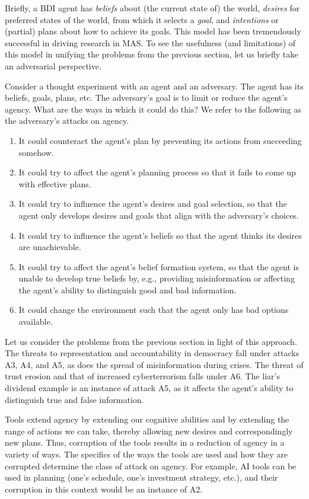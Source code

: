 Briefly, a BDI agent has \emph{beliefs} about (the current state of) the world, \emph{desires} for preferred states of the world, from which
it selects a \emph{goal}, and \emph{intentions} or (partial) plans about how to achieve its goals. This model has been tremendously 
successful in driving research in MAS. To see the usefulness (and limitations) of this model in unifying the problems from the previous
section, let us briefly take an adversarial perspective.

Consider a thought experiment with an agent and an adversary. The agent has its beliefs, goals, plans, etc. The adversary's goal is to limit or 
reduce the agent's agency. What are the ways in which it could do this? We refer to the following as the adversary's attacks on agency.
\begin{enumerate}[label=(A\arabic*)]
    \item It could counteract the agent's plan by preventing its actions from succeeding somehow.
    \item It could try to affect the agent's planning process so that it fails to come up with effective plans.
    \item It could try to influence the agent's desires and goal selection, so that the agent only develops desires and goals that align with the adversary's choices.
    \item It could try to influence the agent's beliefs so that the agent thinks its desires are unachievable.
    \item It could try to affect the agent's belief formation system, so that the agent is unable to develop
    true beliefs by, e.g., providing misinformation or affecting the agent's ability to distinguish good and bad information.
    \item It could change the environment such that the agent only has bad options available.
\end{enumerate}

Let us consider the problems from the previous section in light of this approach. The threats to representation and accountability in
democracy fall under attacks A3, A4, and A5, as does the spread of misinformation during crises. The threat of trust erosion and that of 
increased cyberterrorism falls under A6. The liar's dividend example is an instance of attack A5, as it affects the agent's ability to 
distinguish true and false information.

Tools extend agency by extending our cognitive abilities and by extending the range of actions we can take, thereby allowing new desires
and correspondingly new plans. Thus, corruption of the tools results in a reduction of agency in a variety of ways. The specifics of the ways 
the tools are used and how they are corrupted determine the class of  attack on agency. For example, AI tools can be used in planning (one's 
schedule, one's investment  strategy, etc.), and their corruption in this context would be an instance of A2. 

